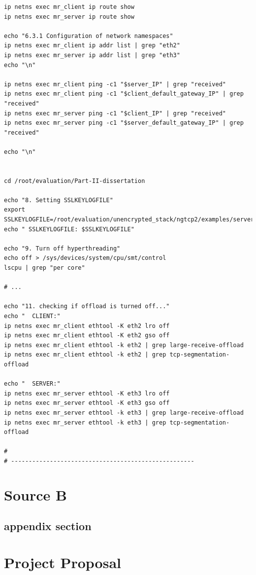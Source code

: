 \documentclass[12pt,a4paper,twoside,openright]{report}
\begin{document}
\begin{verbatim}
ip netns exec mr_client ip route show
ip netns exec mr_server ip route show

echo "6.3.1 Configuration of network namespaces"
ip netns exec mr_client ip addr list | grep "eth2"
ip netns exec mr_server ip addr list | grep "eth3"
echo "\n"

ip netns exec mr_client ping -c1 "$server_IP" | grep "received"
ip netns exec mr_client ping -c1 "$client_default_gateway_IP" | grep "received"
ip netns exec mr_server ping -c1 "$client_IP" | grep "received"
ip netns exec mr_server ping -c1 "$server_default_gateway_IP" | grep "received"

echo "\n"


cd /root/evaluation/Part-II-dissertation

echo "8. Setting SSLKEYLOGFILE"
export SSLKEYLOGFILE=/root/evaluation/unencrypted_stack/ngtcp2/examples/server.key
echo " SSLKEYLOGFILE: $SSLKEYLOGFILE"

echo "9. Turn off hyperthreading"
echo off > /sys/devices/system/cpu/smt/control
lscpu | grep "per core"

# ...

echo "11. checking if offload is turned off..."
echo "  CLIENT:"
ip netns exec mr_client ethtool -K eth2 lro off
ip netns exec mr_client ethtool -K eth2 gso off
ip netns exec mr_client ethtool -k eth2 | grep large-receive-offload
ip netns exec mr_client ethtool -k eth2 | grep tcp-segmentation-offload

echo "  SERVER:"
ip netns exec mr_server ethtool -K eth3 lro off
ip netns exec mr_server ethtool -K eth3 gso off
ip netns exec mr_server ethtool -k eth3 | grep large-receive-offload
ip netns exec mr_server ethtool -k eth3 | grep tcp-segmentation-offload

#
# ----------------------------------------------------

\end{verbatim}

\chapter{Source B}

    \section{appendix section}\label{referencedAppendixTag}

\chapter{Project Proposal}


 
\end{document}
